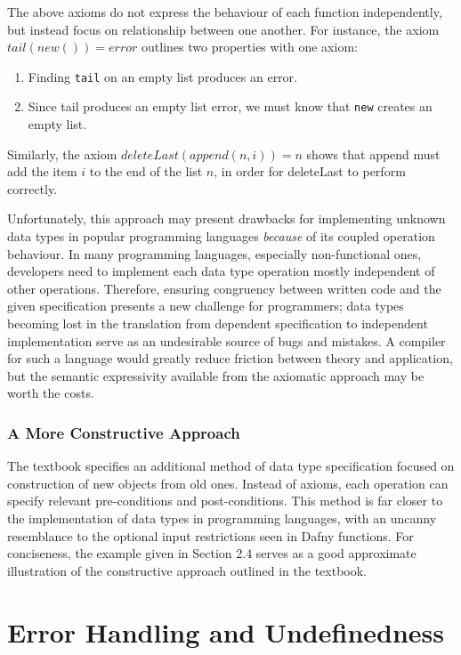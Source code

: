 \documentclass{article}
\begin{document}
The above axioms do not express the behaviour of each function independently, but instead focus on relationship between one another.
For instance, the axiom $tail(new()) = error$ outlines two properties with one axiom:
\begin{enumerate}
    \item Finding \texttt{tail} on an empty list produces an error.
    \item Since tail produces an empty list error, we must know that \texttt{new} creates an empty list.
\end{enumerate}
Similarly, the axiom $deleteLast(append(n, i)) = n$ shows that append must add the item $i$
to the end of the list $n$, in order for deleteLast to perform correctly.

Unfortunately, this approach may present drawbacks for implementing unknown data types in popular programming languages
\textit{because} of its coupled operation behaviour. In many programming languages, especially non-functional ones,
developers need to implement each data type operation mostly independent of other operations. Therefore, ensuring congruency
between written code and the given specification presents a new challenge for programmers;
data types becoming lost in the translation from dependent specification to independent implementation serve
as an undesirable source of bugs and mistakes. A compiler for such a language would greatly reduce friction between
theory and application, but the semantic expressivity available from the axiomatic approach may be worth the costs.

\subsubsection{A More Constructive Approach}

The textbook \cite{ADTspec} specifies an additional method of data type specification focused on construction
of new objects from old ones. Instead of axioms, each operation can specify relevant pre-conditions and post-conditions.
This method is far closer to the implementation of data types in programming languages, with an uncanny resemblance
to the optional input restrictions seen in Dafny functions. For conciseness, the example given in Section 2.4
serves as a good approximate illustration of the constructive approach outlined in the textbook.

\section{Error Handling and Undefinedness}
\end{document}
